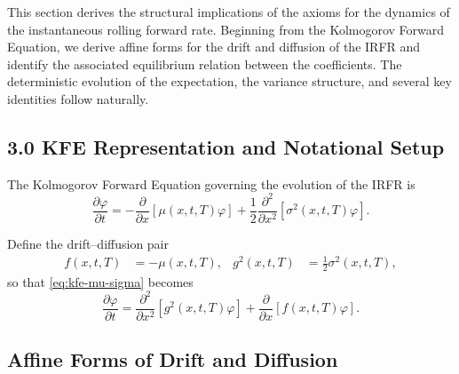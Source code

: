 \documentclass[12pt]{article}
\theoremstyle{statementstyle}
\begin{document}
This section derives the structural implications of the axioms for the
dynamics of the instantaneous rolling forward rate. Beginning from the
Kolmogorov Forward Equation, we derive affine forms for the drift and
diffusion of the IRFR and identify the associated equilibrium relation
between the coefficients. The deterministic
evolution of the expectation, the variance structure, and several key
identities follow naturally.

\subsection*{3.0 \quad KFE Representation and Notational Setup}

The Kolmogorov Forward Equation governing the evolution of the IRFR is
\begin{equation}
\frac{\partial \varphi}{\partial t}
=
-\frac{\partial}{\partial x}\!\left[\mu(x,t,T)\varphi\right]
+
\frac{1}{2}\frac{\partial^{2}}{\partial x^{2}}
\!\left[\sigma^{2}(x,t,T)\varphi\right].
\tag{3.0.1}\label{eq:kfe-mu-sigma}
\end{equation}

Define the drift--diffusion pair
\begin{align}
f(x,t,T) &= -\mu(x,t,T), &
g^{2}(x,t,T) &= \tfrac12 \sigma^{2}(x,t,T),
\tag{3.0.2--3.0.3}
\end{align}
so that \eqref{eq:kfe-mu-sigma} becomes
\begin{equation}
\frac{\partial \varphi}{\partial t}
=
\frac{\partial^{2}}{\partial x^{2}}\!\left[g^{2}(x,t,T)\varphi\right]
+
\frac{\partial}{\partial x}\!\left[f(x,t,T)\varphi\right].
\tag{3.0.4}\label{eq:kfe-f-g}
\end{equation}

\subsection{Affine Forms of Drift and Diffusion}
\end{document}
